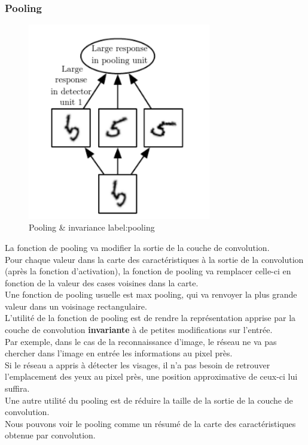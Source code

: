 \documentclass[11pt]{article}
\begin{document}
\subsubsection{Pooling}
\label{sec:orgb914a5c}
\begin{figure}[htbp]
\centering
\includegraphics[width=8cm]{pooling.png}
\caption{Pooling \& invariance label:pooling}
\end{figure}
La fonction de pooling va modifier la sortie de la couche de convolution.\\
Pour chaque valeur dans la carte des caractéristiques à la sortie de la convolution (après la fonction d'activation), la fonction de pooling va remplacer celle-ci en fonction de la valeur des cases voisines dans la carte.\\
Une fonction de pooling usuelle est max pooling, qui va renvoyer la plus grande valeur dans un voisinage rectangulaire.\\
L'utilité de la fonction de pooling est de rendre la représentation apprise par la couche de convolution \textbf{invariante} à de petites modifications sur l'entrée.\\
Par exemple, dans le cas de la reconnaissance d'image, le réseau ne va pas chercher dans l'image en entrée les informations au pixel près.\\
Si le réseau a appris à détecter les visages, il n'a pas besoin de retrouver l'emplacement des yeux au pixel près, une position approximative de ceux-ci lui suffira.\\
Une autre utilité du pooling est de réduire la taille de la sortie de la couche de convolution.\\
Nous pouvons voir le pooling comme un résumé de la carte des caractéristiques obtenue par convolution.\\
\end{document}
